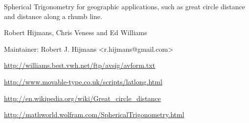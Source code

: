 \begin{Description}\relax
Spherical Trigonometry for geographic applications, such as great circle distance and distance along a rhumb line.
\end{Description}
\begin{Details}\relax
{}
\end{Details}
\begin{Author}\relax
Robert Hijmans, Chris Veness and Ed Williams

Maintainer: Robert J. Hijmans \textless{}r.hijmans@gmail.com\textgreater{}
\end{Author}
\begin{References}\relax
\url{http://williams.best.vwh.net/ftp/avsig/avform.txt}

\url{http://www.movable-type.co.uk/scripts/latlong.html}

\url{http://en.wikipedia.org/wiki/Great_circle_distance}

\url{http://mathworld.wolfram.com/SphericalTrigonometry.html}
\end{References}

